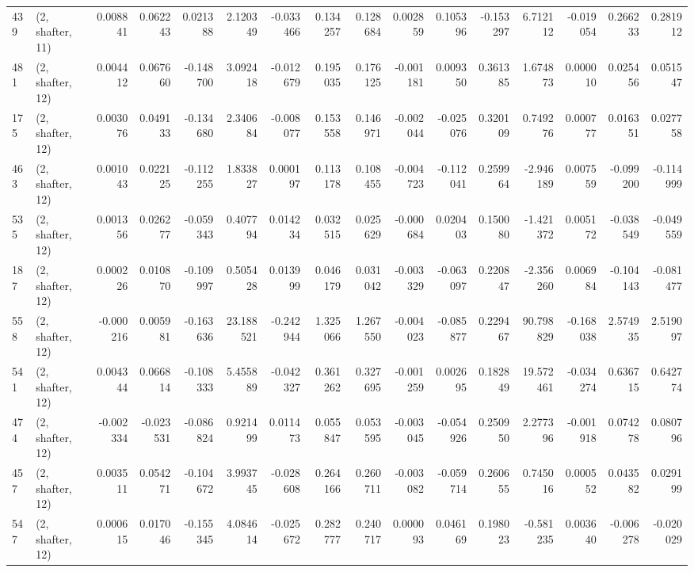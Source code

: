 \begin{tabular}{llrrrrrrrrrrrrrr}
439 &  (2, shafter, 11) &   0.008841 &  0.062243 &  0.021388 &    2.120349 & -0.033466 &   0.134257 &  0.128684 &  0.002859 &  0.105396 & -0.153297 &    6.712112 & -0.019054 &  0.266233 &  0.281912 \\
481 &  (2, shafter, 12) &   0.004412 &  0.067660 & -0.148700 &    3.092418 & -0.012679 &   0.195035 &  0.176125 & -0.001181 &  0.009350 &  0.361385 &    1.674873 &  0.000010 &  0.025456 &  0.051547 \\
175 &  (2, shafter, 12) &   0.003076 &  0.049133 & -0.134680 &    2.340684 & -0.008077 &   0.153558 &  0.146971 & -0.002044 & -0.025076 &  0.320109 &    0.749276 &  0.000777 &  0.016351 &  0.027758 \\
463 &  (2, shafter, 12) &   0.001043 &  0.022125 & -0.112255 &    1.833827 &  0.000197 &   0.113178 &  0.108455 & -0.004723 & -0.112041 &  0.259964 &   -2.946189 &  0.007559 & -0.099200 & -0.114999 \\
535 &  (2, shafter, 12) &   0.001356 &  0.026277 & -0.059343 &    0.407794 &  0.014234 &   0.032515 &  0.025629 & -0.000684 &  0.020403 &  0.150080 &   -1.421372 &  0.005172 & -0.038549 & -0.049559 \\
187 &  (2, shafter, 12) &   0.000226 &  0.010870 & -0.109997 &    0.505428 &  0.013999 &   0.046179 &  0.031042 & -0.003329 & -0.063097 &  0.220847 &   -2.356260 &  0.006984 & -0.104143 & -0.081477 \\
558 &  (2, shafter, 12) &  -0.000216 &  0.005981 & -0.163636 &   23.188521 & -0.242944 &   1.325066 &  1.267550 & -0.004023 & -0.085877 &  0.229467 &   90.798829 & -0.168038 &  2.574935 &  2.519097 \\
541 &  (2, shafter, 12) &   0.004344 &  0.066814 & -0.108333 &    5.455889 & -0.042327 &   0.361262 &  0.327695 & -0.001259 &  0.002695 &  0.182849 &   19.572461 & -0.034274 &  0.636715 &  0.642774 \\
474 &  (2, shafter, 12) &  -0.002334 & -0.023531 & -0.086824 &    0.921499 &  0.011473 &   0.055847 &  0.053595 & -0.003045 & -0.054926 &  0.250950 &    2.277396 & -0.001918 &  0.074278 &  0.080796 \\
457 &  (2, shafter, 12) &   0.003511 &  0.054271 & -0.104672 &    3.993745 & -0.028608 &   0.264166 &  0.260711 & -0.003082 & -0.059714 &  0.260655 &    0.745016 &  0.000552 &  0.043582 &  0.029199 \\
547 &  (2, shafter, 12) &   0.000615 &  0.017046 & -0.155345 &    4.084614 & -0.025672 &   0.282777 &  0.240717 &  0.000093 &  0.046169 &  0.198023 &   -0.581235 &  0.003640 & -0.006278 & -0.020029 \\

\end{tabular}
